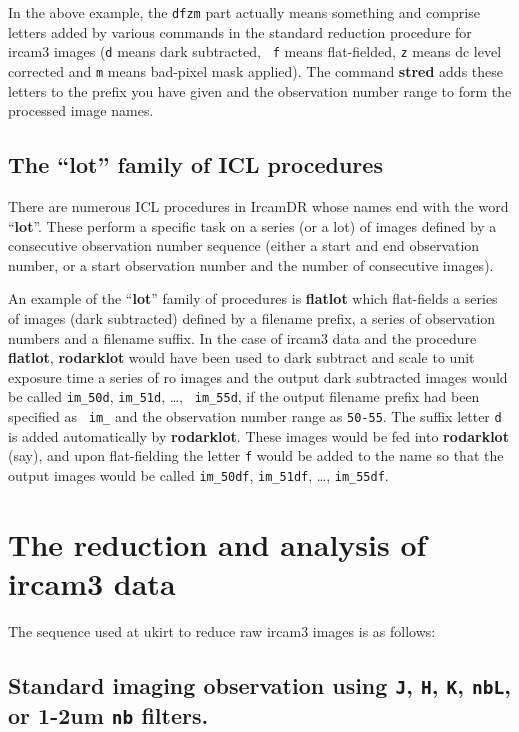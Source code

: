 In the above example, the {\tt dfzm} part actually means something and
comprise letters added by various commands in the standard reduction
procedure for {\sc ircam3} images ({\tt d} means dark subtracted, {\tt
f} means flat-fielded, {\tt z} means dc level corrected and {\tt m}
means bad-pixel mask applied).  The command {\bf stred} adds these
letters to the prefix you have given and the observation number range
to form the processed image names.

\subsection{\label{ss:lot_procedures}The ``lot'' family of ICL procedures}

There are numerous ICL procedures in {\sc IrcamDR} whose names end with
the word ``{\bf lot}''.  These perform a specific task on a series (or
a lot) of images defined by a consecutive observation number sequence
(either a start and end observation number, or a start observation
number and the number of consecutive images).

An example of the ``{\bf lot}'' family of procedures is {\bf flatlot} which
flat-fields a series of images (dark subtracted) defined by a filename
prefix, a series of observation numbers and a filename suffix.  In the
case of {\sc ircam3} data and the procedure {\bf flatlot}, {\bf
rodarklot} would have been used to dark subtract and scale to unit
exposure time a series of {\sc ro} images and the output dark subtracted
images would be called {\tt im\_50d}, {\tt im\_51d}, \ldots, {\tt
im\_55d}, if the output filename prefix had been specified as {\tt
im\_} and the observation number range as {\tt 50-55}.  The suffix
letter {\tt d} is added automatically by {\bf rodarklot}.  These images
would be fed into {\bf rodarklot} (say), and upon flat-fielding the
letter {\tt f} would be added to the name so that the output images
would be called {\tt im\_50df}, {\tt im\_51df}, \ldots, {\tt im\_55df}.

\section{\label{se:ircam3_data_analysis}The reduction and analysis of {\sc ircam3} data}

The sequence used at {\sc ukirt} to reduce raw {\sc ircam3}
images is as follows:

\subsection{\label{ss:standard_imaging}Standard imaging observation using {\tt J}, {\tt H}, {\tt K}, {\tt nbL}, or 1-2um {\tt nb} filters.}

